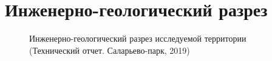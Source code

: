 \chapter{Инженерно-геологический разрез}\label{app:razrez}

\begin{figure}[ht]
  \caption{Инженерно-геологический разрез исследуемой территории (Технический отчет. Саларьево-парк, 2019)}\label{fig:fig}
\end{figure}

